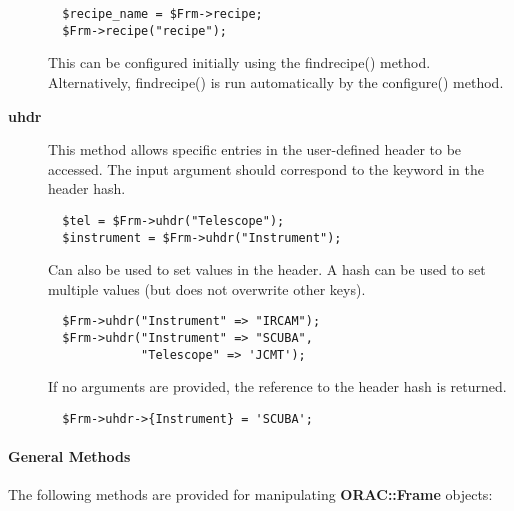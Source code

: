\begin{description}
\begin{verbatim}
  $recipe_name = $Frm->recipe;
  $Frm->recipe("recipe");
\end{verbatim}


This can be configured initially using the findrecipe() method.
Alternatively, findrecipe() is run automatically by the configure()
method.

\item[\textbf{uhdr}] \mbox{}

This method allows specific entries in the user-defined header to be 
accessed. The input argument should correspond to the keyword in the header
hash.

\begin{verbatim}
  $tel = $Frm->uhdr("Telescope");
  $instrument = $Frm->uhdr("Instrument");
\end{verbatim}


Can also be used to set values in the header.
A hash can be used to set multiple values (but does not overwrite
other keys).

\begin{verbatim}
  $Frm->uhdr("Instrument" => "IRCAM");
  $Frm->uhdr("Instrument" => "SCUBA", 
             "Telescope" => 'JCMT');
\end{verbatim}


If no arguments are provided, the reference to the header hash
is returned.

\begin{verbatim}
  $Frm->uhdr->{Instrument} = 'SCUBA';
\end{verbatim}
\end{description}
\paragraph*{General Methods\label{ORAC::Frame_General_Methods}}

The following methods are provided for manipulating
\textbf{ORAC::Frame} objects:

